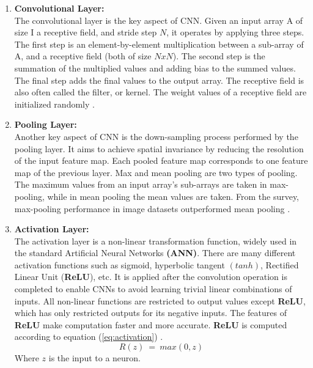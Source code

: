 \begin{enumerate}
    \item {\bf Convolutional Layer:} \\[5pt]
        The convolutional layer is the key aspect of CNN. Given an input 
        array A of size I a receptive field, and stride step $N$, it operates 
        by applying three steps. The first step is an element-by-element 
        multiplication between a sub-array of A, and a receptive field 
        (both of size $N x N$). The second step is the summation of the 
        multiplied values and adding bias to the summed values. The 
        final step adds the final values to the output array. The 
        receptive field is also often called the filter, or kernel. 
        The weight values of a receptive field are initialized randomly \cite{esr20}.

    \item {\bf Pooling Layer:} \\[5pt]
        Another key aspect of CNN is the down-sampling process performed by 
        the pooling layer. It aims to achieve spatial invariance by reducing 
        the resolution of the input feature map. Each pooled feature map 
        corresponds to one feature map of the previous layer. Max and mean 
        pooling are two types of pooling. The maximum values from an input 
        array's sub-arrays are taken in max-pooling, while in mean pooling 
        the mean values are taken. From the survey, max-pooling performance 
        in image datasets outperformed mean pooling \cite{esr20}.

    \item {\bf Activation Layer:} \\[5pt]
        The activation layer is a non-linear transformation function, widely 
        used in the standard Artificial Neural Networks {\bf (ANN)}. There are many 
        different activation functions such as sigmoid, hyperbolic tangent $(tanh)$, 
        Rectified Linear Unit ({\bf ReLU}), etc. It is applied after the convolution operation 
        is completed to enable CNNs to avoid learning trivial linear combinations of inputs. 
        All non-linear functions are restricted to output values except {\bf ReLU}, which has only 
        restricted outputs for its negative inputs. The features of {\bf ReLU} make computation faster 
        and more accurate. {\bf ReLU} is computed according to equation (\ref{eq:activation}) \cite{esr20}.
        \begin{equation} \label{eq:activation}
            R(z) \ = \ max(0, z)
        \end{equation}
        Where $z$ is the input to a neuron.


\end{enumerate}
